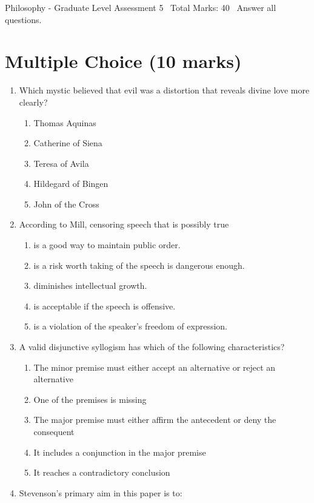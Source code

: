 \documentclass[12pt]{article}
\begin{document}
\begin{center}
Philosophy - Graduate Level Assessment 5 \
Total Marks: 40 \
Answer all questions.
\end{center}

\section*{Multiple Choice (10 marks)}
\begin{enumerate}[label=\arabic*.]
\item Which mystic believed that evil was a distortion that reveals divine love more clearly?
\begin{enumerate}[label=(\alph*)]
    \item Thomas Aquinas
    \item Catherine of Siena
    \item Teresa of Avila
    \item Hildegard of Bingen
    \item John of the Cross
\end{enumerate}
\item According to Mill, censoring speech that is possibly true
\begin{enumerate}[label=(\alph*)]
    \item is a good way to maintain public order.
    \item is a risk worth taking of the speech is dangerous enough.
    \item diminishes intellectual growth.
    \item is acceptable if the speech is offensive.
    \item is a violation of the speaker's freedom of expression.
\end{enumerate}
\item A valid disjunctive syllogism has which of the following characteristics?
\begin{enumerate}[label=(\alph*)]
    \item The minor premise must either accept an alternative or reject an alternative
    \item One of the premises is missing
    \item The major premise must either affirm the antecedent or deny the consequent
    \item It includes a conjunction in the major premise
    \item It reaches a contradictory conclusion
\end{enumerate}
\item Stevenson's primary aim in this paper is to:

\end{enumerate}
\end{document}
